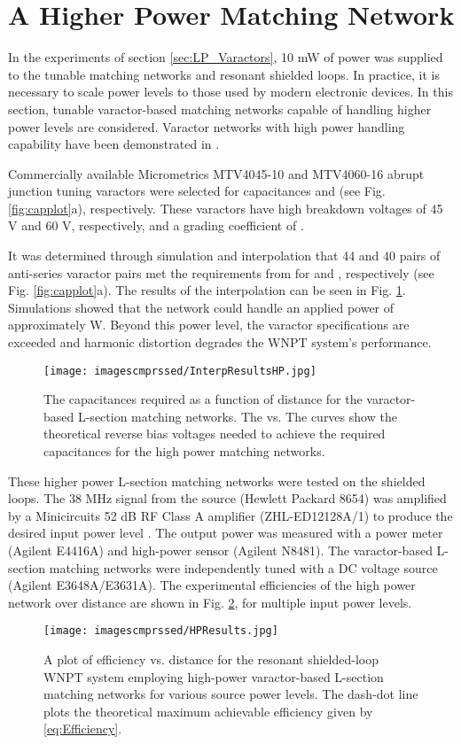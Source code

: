 \documentclass[journal]{IEEEtran}
\begin{document}
\section{A Higher Power Matching Network}

In the experiments of section \ref{sec:LP_Varactors}, 10 mW of power was supplied to the tunable matching networks and resonant shielded loops. In practice, it is necessary to scale power levels to those used by modern electronic devices. In this section, tunable varactor-based matching networks capable of handling higher power levels are considered. Varactor networks with high power handling capability have been demonstrated in \cite{VaracAmps,Buis1}.

Commercially available Micrometrics MTV4045-10 and MTV4060-16 abrupt junction tuning varactors were selected for capacitances  and  (see Fig. \ref{fig:capplot}a), respectively. These varactors have high breakdown voltages  of 45 V and 60 V, respectively, and a grading coefficient of .

It was determined through simulation and interpolation that 44 and 40 pairs of anti-series varactor pairs met the requirements from for  and , respectively (see Fig. \ref{fig:capplot}a). The results of the interpolation can be seen in Fig. \ref{fig:InterpResultsHP}. Simulations showed that the network could handle an applied power of approximately  W. Beyond this power level, the varactor specifications are exceeded and harmonic distortion degrades the WNPT system's performance.
\begin{figure}[htbp]
    \centering
    \texttt{[image: imagescmprssed/InterpResultsHP.jpg]}
    \caption{The capacitances required as a function of distance for the varactor-based L-section matching networks. The  vs. The curves show the theoretical reverse bias voltages needed to achieve the required capacitances for the high power matching networks.}
    \label{fig:InterpResultsHP}
\end{figure}

These higher power L-section matching networks were tested on the shielded loops. The 38 MHz signal from the source (Hewlett Packard 8654) was amplified by a Minicircuits 52 dB RF Class A amplifier (ZHL-ED12128A/1) to produce the desired input power level . The output power was measured with a power meter (Agilent E4416A) and high-power sensor (Agilent N8481). The varactor-based L-section matching networks were independently tuned with a DC voltage source (Agilent E3648A/E3631A). The experimental efficiencies of the high power network over distance are shown in Fig. \ref{fig:HPResults}, for multiple input power levels.
\begin{figure}[htbp]
    \centering
    \texttt{[image: imagescmprssed/HPResults.jpg]}
    \caption{A plot of efficiency vs. distance for the resonant shielded-loop WNPT system employing high-power varactor-based L-section matching networks for various source power levels. The dash-dot line plots the theoretical maximum achievable efficiency given by \ref{eq:Efficiency}.}
    \label{fig:HPResults}
\end{figure}
\end{document}
